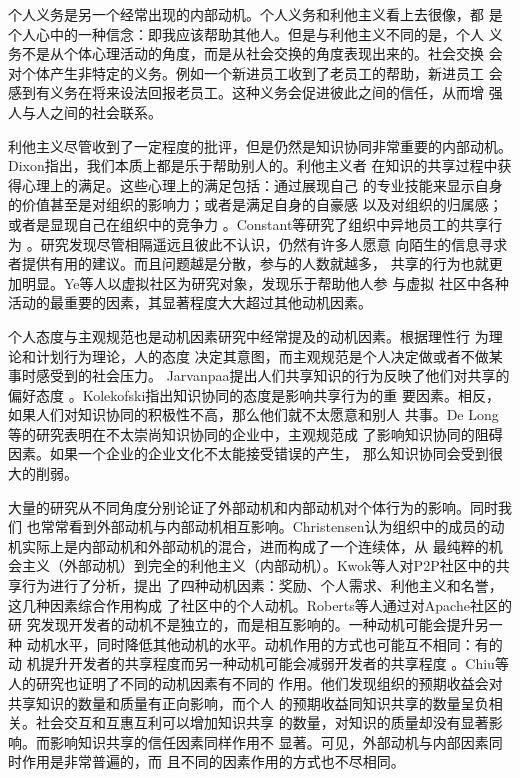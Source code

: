 个人义务是另一个经常出现的内部动机。个人义务和利他主义看上去很像，都
是个人心中的一种信念：即我应该帮助其他人。但是与利他主义不同的是，个人
义务不是从个体心理活动的角度，而是从社会交换的角度表现出来的。社会交换
会对个体产生非特定的义务。例如一个新进员工收到了老员工的帮助，新进员工
会感到有义务在将来设法回报老员工。这种义务会促进彼此之间的信任，从而增
强人与人之间的社会联系\cite{gouldner1960nrp}。

利他主义尽管收到了一定程度的批评，但是仍然是知识协同非常重要的内部动机。
Dixon指出，我们本质上都是乐于帮助别人的\cite{dixon2000ckc}。利他主义者
在知识的共享过程中获得心理上的满足。这些心理上的满足包括：通过展现自己
的专业技能来显示自身的价值甚至是对组织的影响力；或者是满足自身的自豪感
以及对组织的归属感；或者是显现自己在组织中的竞争力
\cite{443078119941201}。Constant等研究了组织中异地员工的共享行为
\cite{44348771996}。研究发现尽管相隔遥远且彼此不认识，仍然有许多人愿意
向陌生的信息寻求者提供有用的建议。而且问题越是分散，参与的人数就越多，
共享的行为也就更加明显。Ye等人以虚拟社区为研究对象，发现乐于帮助他人参
与虚拟
社区中各种活动的最重要的因素，其显著程度大大超过其他动机因素\cite{Ye2006}。

个人态度与主观规范也是动机因素研究中经常提及的动机因素。根据理性行
为理论\cite{fishbein1975bai}和计划行为理论\cite{Ajzenbw2002}，人的态度
决定其意图，而主观规范是个人决定做或者不做某事时感受到的社会压力。
Jarvanpaa提出人们共享知识的行为反映了他们对共享的偏好态度
\cite{Jarvenpaaee2000}。Kolekofski指出知识协同的态度是影响共享行为的重
要因素。相反，如果人们对知识协同的积极性不高，那么他们就不太愿意和别人
共事\cite{cabrera2002ksd}。De Long等的研究表明在不太崇尚知识协同的企业中，主观规范成
了影响知识协同的阻碍因素\cite{DeLong2000}。如果一个企业的企业文化不太能接受错误的产生，
那么知识协同会受到很大的削弱。

大量的研究从不同角度分别论证了外部动机和内部动机对个体行为的影响。同时我们
也常常看到外部动机与内部动机相互影响。Christensen认为组织中的成员的动机实际上是内部动机和外部动机的混合，进而构成了一个连续体，从
最纯粹的机会主义（外部动机）到完全的利他主义（内部动机）\cite{Christensen2005}。Kwok等人对P2P社区中的共享行为进行了分析，提出
了四种动机因素：奖励、个人需求、利他主义和名誉，这几种因素综合作用构成
了社区中的个人动机\cite{kwok2004ksc}。Roberts等人通过对Apache社区的研
究发现开发者的动机不是独立的，而是相互影响的。一种动机可能会提升另一种
动机水平，同时降低其他动机的水平。动机作用的方式也可能互不相同：有的动
机提升开发者的共享程度而另一种动机可能会减弱开发者的共享程度
\cite{2151758320060701}。Chiu等人的研究也证明了不同的动机因素有不同的
作用。他们发现组织的预期收益会对共享知识的数量和质量有正向影响，而个人
的预期收益同知识共享的数量呈负相关。社会交互和互惠互利可以增加知识共享
的数量，对知识的质量却没有显著影响。而影响知识共享的信任因素同样作用不
显著\cite{Chiu2006}。可见，外部动机与内部因素同时作用是非常普遍的，而
且不同的因素作用的方式也不尽相同。


